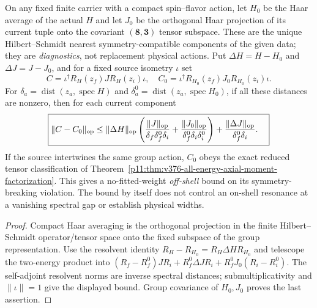 \documentclass[12pt,a4paper]{article}
\begin{document}
\begin{proposition}
\label{p11:prop:v376-haar-symmetry-response-bound}
On any fixed finite carrier with a compact spin--flavor action,
let $H_0$ be the Haar average of the actual $H$ and let $J_0$
be the orthogonal Haar projection of its current tuple onto
the covariant $(\mathbf8,\mathbf3)$ tensor subspace. These
are the unique Hilbert--Schmidt nearest symmetry-compatible
components of the given data; they are \emph{diagnostics}, not
replacement physical actions. Put $\Delta H=H-H_0$ and
$\Delta J=J-J_0$, and for a fixed source isometry $\iota$ set
\[
 C=\iota^\dagger R_H(z_f)J R_H(z_i)\iota,
 \quad C_0=\iota^\dagger R_{H_0}(z_f)J_0 R_{H_0}(z_i)\iota.
\]
For $\delta_a=\operatorname{dist}(z_a,\operatorname{spec}H)$
and $\delta_a^0=\operatorname{dist}(z_a,\operatorname{spec}H_0)$,
if all these distances are nonzero, then for each current component
\[
\boxed{\begin{aligned}
\|C-C_0\|_{\rm op}\le {}&\|\Delta H\|_{\rm op}
 \left(\frac{\|J\|_{\rm op}}{\delta_f\delta_f^0\delta_i}
 +\frac{\|J_0\|_{\rm op}}{\delta_f^0\delta_i\delta_i^0}\right)
 +\frac{\|\Delta J\|_{\rm op}}{\delta_f^0\delta_i}.
\end{aligned}}
\]
If the source intertwines the same group action, $C_0$ obeys
the exact reduced tensor classification of
Theorem~\ref{p11:thm:v376-all-energy-axial-moment-factorization}.
This gives a no-fitted-weight \emph{off-shell} bound on its
symmetry-breaking violation. The bound by itself does not control
an on-shell resonance at a vanishing spectral gap or establish
physical widths.
\end{proposition}
\begin{proof}
Compact Haar averaging is the orthogonal projection in the
finite Hilbert--Schmidt operator/tensor space onto the fixed
subspace of the group representation. Use the resolvent identity
$R_H-R_{H_0}=R_H\Delta H R_{H_0}$ and telescope the two-energy
product into
$(R_f-R_f^0)JR_i+R_f^0\Delta J R_i+
 R_f^0J_0(R_i-R_i^0)$.
The self-adjoint resolvent norms are inverse spectral distances;
submultiplicativity and $\|\iota\|=1$ give the displayed
bound. Group covariance of $H_0,J_0$ proves the last assertion.
\end{proof}

\end{document}
